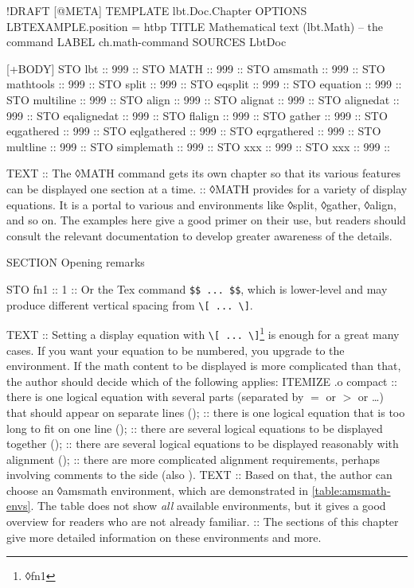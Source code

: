 \begin{lbt}
  !DRAFT
  [@META]
    TEMPLATE lbt.Doc.Chapter
    OPTIONS LBTEXAMPLE.position = htbp
    TITLE Mathematical text \textsf{(lbt.Math)} -- the  command
    LABEL ch.math-command
    SOURCES LbtDoc

  [+BODY]
    STO lbt :: 999 :: \lbtlogo{}
    STO MATH :: 999 :: 
    STO amsmath :: 999 :: 
    STO mathtools :: 999 :: 
    STO split :: 999 :: 
    STO eqsplit :: 999 :: 
    STO equation :: 999 :: 
    STO multiline :: 999 :: 
    STO align :: 999 :: 
    STO alignat :: 999 :: 
    STO alignedat :: 999 :: 
    STO eqalignedat :: 999 :: 
    STO flalign :: 999 :: 
    STO gather :: 999 :: 
    STO eqgathered :: 999 :: 
    STO eqlgathered :: 999 :: 
    STO eqrgathered :: 999 :: 
    STO multline :: 999 :: 
    STO simplemath :: 999 :: 
    STO xxx :: 999 :: 
    STO xxx :: 999 :: 

    TEXT
    :: The ◊MATH command gets its own chapter so that its various features can be displayed one section at a time.
    :: ◊MATH provides for a variety of display equations. It is a portal to various  and  environments like ◊split, ◊gather, ◊align, and so on. The examples here give a good primer on their use, but readers should consult the relevant documentation to develop greater awareness of the details.

    SECTION Opening remarks

    STO fn1 :: 1 :: Or the Tex command \Verb|$$ ... $$|, which is lower-level and may produce different vertical spacing from \Verb|\[ ... \]|.

    TEXT
    :: Setting a display equation with \Verb|\[ ... \]|\footnote{◊fn1} is enough for a great many cases. If you want your equation to be numbered, you upgrade to the  environment. If the math content to be displayed is more complicated than that, the author should decide which of the following applies:
    ITEMIZE .o compact
    :: there is one logical equation with several parts (separated by $=$ or $>$ or \dots) that should appear on separate lines ();
    :: there is one logical equation that is too long to fit on one line ();
    :: there are several logical equations to be displayed together ();
    :: there are several logical equations to be displayed reasonably with alignment ();
    :: there are more complicated alignment requirements, perhaps involving comments to the side (also ).
    TEXT
    :: Based on that, the author can choose an ◊amsmath environment, which are demonstrated in \cref{table:amsmath-envs}. The table does not show \emph{all} available environments, but it gives a good overview for readers who are not already familiar.
    :: The sections of this chapter give more detailed information on these environments and more.


\end{lbt}
